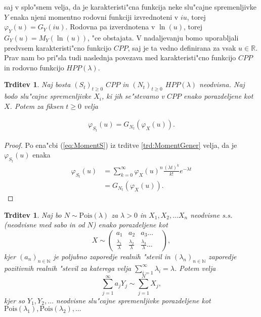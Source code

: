 \documentclass[12pt, a4paper, reqno]{amsart}
\theoremstyle{definition}
\theoremstyle{plain}
\newtheorem{trditev}[definicija]{Trditev}
\newcommand{\R}{\mathbb{R}}
\newcommand{\N}{\mathbb{N}}
\newcommand{\1}{\mathds{1}}
\newcommand{\Pois}[1]{\text{Pois}(#1)}
\begin{document}
    \noindent
    saj v splo"snem velja, da je karakteristi"cna funkcija neke slu"cajne spremenljivke $Y$ enaka
    njeni momentno rodovni funkciji izvrednoteni v $iu$, torej $\varphi_Y(u) = G_Y(iu)$. Rodovna pa 
    izverdnotena v $\ln(u)$, torej $G_Y(u) = M_Y(\ln(u))$, "ce obstajata.
    V nadaljevanju bomo uporabljali predvsem karakteristi"cno funkcijo $CPP$, saj je ta vedno definirana 
    za vsak $u\in\R$. Prav nam bo pri"sla tudi naslednja povezava med karakteristi"cno funkcijo $CPP$ 
    in rodovno funkcijo $HPP(\lambda)$.
    \begin{trditev}
        Naj bosta $(S_t)_{t\geq0}$ $CPP$ in $(N_t)_{t\geq0}$ $HPP(\lambda)$ neodvisna. 
        Naj bodo slu"cajne spremenljivke $X_i$, ki jih se"stevamo v $CPP$ enako porazdeljene kot $X$. 
        Potem za fiksen $t\geq0$ velja

        \begin{align*}
            \varphi_{S_t}(u) = G_{N_t}\left(\varphi_{X}(u)\right).
        \end{align*}

        \label{trd:povezavaRodovneKarkateristicne}
    \end{trditev}

    \begin{proof}
        Po ena"cbi (\ref{eq:MomentS}) iz trditve \ref{trd:MomentGener} velja, da je $\varphi_{S_t}(u)$ enaka
        \begin{align*}
            \varphi_{S_t}(u) &= \sum_{k=0}^{\infty}
            \varphi_X(u)^n\frac{(\lambda t)^k}{k!}e^{-\lambda t} \\
            &= G_{N_t}\left(\varphi_X(u)\right).
        \end{align*}
    \end{proof}


    \begin{trditev}
        Naj bo $N\sim \Pois{\lambda}$  za $\lambda >0$ in $X_1, X_2, \dots X_n$ neodvisne s.s. (neodvisne 
        med sabo in od $N$) enako porazdeljene kot
        $$ X\sim
        \begin{pmatrix}
            a_1 & a_2 & a_3  \dots & \\
            \tfrac{\lambda_1}{\lambda} & \tfrac{\lambda_2}{\lambda} & \tfrac{\lambda_3}{\lambda} \dots & 
        \end{pmatrix},
        $$
        kjer $(a_n)_{n\in\N}$ je poljubno zaporedje realnih "stevil in 
        $(\lambda_n)_{n\in\N}$ zaporedje pozitivnih realnih "stevil za katerega velja 
        ${\sum_{i=1}^\infty\lambda_i = \lambda}$.
        Potem velja 
        \begin{equation*}
            \sum_{j=1}^\infty a_jY_j \sim \sum_{j=1}^NX_j,
        \end{equation*}
        kjer so $Y_1,Y_2,  \dots$ neodvisne slu"cajne spremenljivke porazdeljene kot \\
        $\Pois{\lambda_1},\Pois{\lambda_2}, \dots$
        \label{trd:NXjeEnakoaY}
    \end{trditev}
\end{document}
